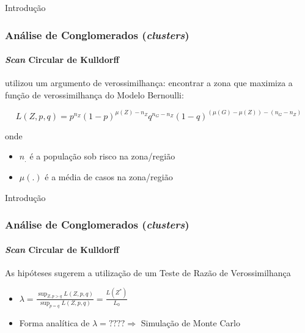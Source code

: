 \documentclass[aspectratio=169]{beamer}
\begin{document}
\begin{frame}{Introdução}
\frametitle{Análise de Conglomerados (\textit{clusters})}
\framesubtitle{\textit{Scan} Circular de Kulldorff}

\cite{kulldorff1997spatial} utilizou um argumento de verossimilhança: encontrar a zona que maximiza a função de verossimilhança do Modelo Bernoulli: 

\begin{equation}
\label{eq:lh}
L(Z, p, q) = p^{n_Z}(1 - p)^{\mu(Z) - n_Z}q^{n_G - n_Z}(1-q)^{(\mu(G) - \mu(Z))-(n_G - n_Z)}
\end{equation}



onde

\begin{itemize}
\item $n_.$ é a população sob risco na zona/região
\item $\mu(.)$ é a média de casos na zona/região
\end{itemize}



\end{frame}

\begin{frame}{Introdução}
\frametitle{Análise de Conglomerados (\textit{clusters})}
\framesubtitle{\textit{Scan} Circular de Kulldorff}

As hipóteses sugerem a utilização de um Teste de Razão de Verossimilhança
\begin{itemize}
\item $\lambda = \frac{\sup_{Z,p>q} L(Z, p, q)}{\sup_{p = q}L(Z, p, q)} = \frac{L(Z^*)}{L_0}$
\item Forma analítica de $\lambda = ???? \Rightarrow$ Simulação de Monte Carlo
\end{itemize}

\end{frame}

\end{document}
